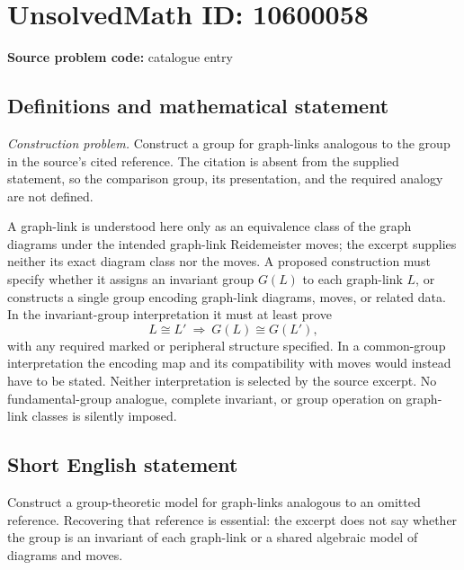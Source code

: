 \documentclass[11pt]{article}
\begin{document}
\section*{UnsolvedMath ID: 10600058}
\textbf{Source problem code:} catalogue entry
\subsection{Definitions and mathematical statement}
\emph{Construction problem.} Construct a group for graph-links analogous to the group in the source's cited reference. The citation is absent from the supplied statement, so the comparison group, its presentation, and the required analogy are not defined.

A graph-link is understood here only as an equivalence class of the graph diagrams under the intended graph-link Reidemeister moves; the excerpt supplies neither its exact diagram class nor the moves. A proposed construction must specify whether it assigns an invariant group \(G(L)\) to each graph-link \(L\), or constructs a single group encoding graph-link diagrams, moves, or related data. In the invariant-group interpretation it must at least prove
\[
 L\cong L'\ \Longrightarrow\ G(L)\cong G(L'),
\]
with any required marked or peripheral structure specified. In a common-group interpretation the encoding map and its compatibility with moves would instead have to be stated. Neither interpretation is selected by the source excerpt. No fundamental-group analogue, complete invariant, or group operation on graph-link classes is silently imposed.
\subsection{Short English statement}
Construct a group-theoretic model for graph-links analogous to an omitted reference. Recovering that reference is essential: the excerpt does not say whether the group is an invariant of each graph-link or a shared algebraic model of diagrams and moves.
\end{document}
